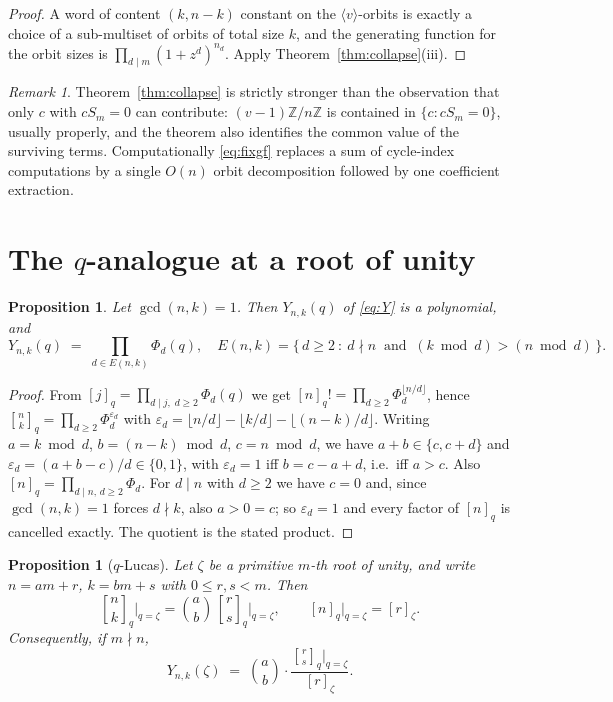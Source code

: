 \documentclass[11pt,a4paper]{article}
\providecommand{\texorpdfstring}[2]{#1}   %
\theoremstyle{plain}
\newtheorem{proposition}[theorem]{Proposition}
\theoremstyle{definition}
\theoremstyle{remark}
\newtheorem{remark}[theorem]{Remark}
\newcommand{\Z}{\mathbb{Z}}
\newcommand{\Zn}{\Z/n\Z}
\newcommand{\qint}[1]{[#1]_q}
\newcommand{\qbin}[2]{\genfrac[]{0pt}{}{#1}{#2}_{q}}
\begin{document}
\begin{proof}
A word of content $(k,n-k)$ constant on the $\langle v\rangle$-orbits is exactly a choice of
a sub-multiset of orbits of total size $k$, and the generating function for the orbit sizes
is $\prod_{d\mid m}(1+z^d)^{n_d}$. Apply Theorem~\ref{thm:collapse}(iii).
\end{proof}

\begin{remark}
Theorem~\ref{thm:collapse} is strictly stronger than the observation that only $c$ with
$cS_m=0$ can contribute: $(v-1)\Zn$ is contained in $\{c:cS_m=0\}$, usually properly, and
the theorem also identifies the common value of the surviving terms. Computationally
\eqref{eq:fixgf} replaces a sum of cycle-index computations by a single $O(n)$ orbit
decomposition followed by one coefficient extraction.
\end{remark}

\section{The \texorpdfstring{$q$}{q}-analogue at a root of unity}\label{sec:eval}

\begin{proposition}\label{prop:factor}
Let $\gcd(n,k)=1$. Then $Y_{n,k}(q)$ of \eqref{eq:Y} is a polynomial, and
\[
  Y_{n,k}(q)\;=\;\prod_{d\in E(n,k)}\Phi_d(q),
  \quad
  E(n,k)=\bigl\{\,d\ge 2\ :\ d\nmid n \ \text{ and }\ (k\bmod d)>(n\bmod d)\,\bigr\}.
\]
\end{proposition}

\begin{proof}
From $\qint{j}=\prod_{d\mid j,\;d\ge2}\Phi_d(q)$ we get
$\qint{n}!=\prod_{d\ge2}\Phi_d^{\lfloor n/d\rfloor}$, hence
$\qbin{n}{k}=\prod_{d\ge2}\Phi_d^{\varepsilon_d}$ with
$\varepsilon_d=\lfloor n/d\rfloor-\lfloor k/d\rfloor-\lfloor (n-k)/d\rfloor$.
Writing $a=k\bmod d$, $b=(n-k)\bmod d$, $c=n\bmod d$, we have $a+b\in\{c,c+d\}$ and
$\varepsilon_d=(a+b-c)/d\in\{0,1\}$, with $\varepsilon_d=1$ iff $b=c-a+d$, i.e.\ iff $a>c$.
Also $\qint{n}=\prod_{d\mid n,\,d\ge2}\Phi_d$. For $d\mid n$ with $d\ge2$ we have
$c=0$ and, since $\gcd(n,k)=1$ forces $d\nmid k$, also $a>0=c$; so $\varepsilon_d=1$ and
every factor of $\qint{n}$ is cancelled exactly. The quotient is the stated product.
\end{proof}

\begin{proposition}[$q$-Lucas]\label{prop:lucas}
Let $\zeta$ be a primitive $m$-th root of unity, and write $n=am+r$, $k=bm+s$ with
$0\le r,s<m$. Then
\[
  \qbin{n}{k}\Big|_{q=\zeta}=\binom{a}{b}\,\qbin{r}{s}\Big|_{q=\zeta},
  \qquad
  \qint{n}\Big|_{q=\zeta}=[r]_{\zeta}.
\]
Consequently, if $m\nmid n$,
\begin{equation}\label{eq:eval}
  Y_{n,k}(\zeta)\;=\;\binom{a}{b}\cdot\frac{\qbin{r}{s}\big|_{q=\zeta}}{[r]_\zeta}.
\end{equation}
\end{proposition}
\end{document}
